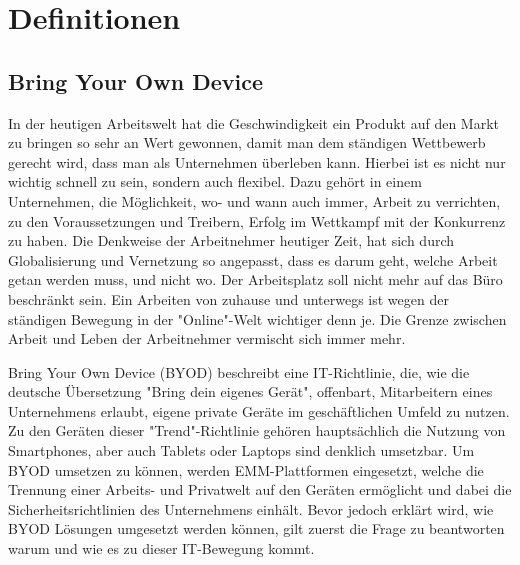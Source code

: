 \chapter{Definitionen}
\label{cha:Definitionen}

\section{Bring Your Own Device}
In der heutigen Arbeitswelt hat die Geschwindigkeit ein Produkt auf den Markt zu bringen so sehr an Wert gewonnen, damit man dem ständigen Wettbewerb gerecht wird, dass man als Unternehmen überleben kann. Hierbei ist es nicht nur wichtig schnell zu sein, sondern auch flexibel. Dazu gehört in einem Unternehmen, die Möglichkeit, wo- und wann auch immer, Arbeit zu verrichten, zu den Voraussetzungen und Treibern, Erfolg im Wettkampf mit der Konkurrenz zu haben. Die Denkweise der Arbeitnehmer heutiger Zeit, hat sich durch Globalisierung und Vernetzung so angepasst, dass es darum geht, welche Arbeit getan werden muss, und nicht wo. Der Arbeitsplatz soll nicht mehr auf das Büro beschränkt sein. Ein Arbeiten von zuhause und unterwegs ist wegen der ständigen Bewegung in der "Online"-Welt wichtiger denn je. Die Grenze zwischen Arbeit und Leben der Arbeitnehmer vermischt sich immer mehr.

Bring Your Own Device (BYOD) beschreibt eine IT-Richtlinie, die, wie die deutsche Übersetzung "Bring dein eigenes Gerät", offenbart, Mitarbeitern eines Unternehmens erlaubt, eigene private Geräte im geschäftlichen Umfeld zu nutzen. Zu den Geräten dieser "Trend"-Richtlinie gehören hauptsächlich die Nutzung von Smartphones, aber auch Tablets oder Laptops sind denklich umsetzbar. Um BYOD umsetzen zu können, werden EMM-Plattformen eingesetzt, welche die Trennung einer Arbeits- und Privatwelt auf den Geräten ermöglicht und dabei die Sicherheitsrichtlinien des Unternehmens einhält. Bevor jedoch erklärt wird, wie BYOD Lösungen umgesetzt werden können, gilt zuerst die Frage zu beantworten warum und wie es zu dieser IT-Bewegung kommt.

